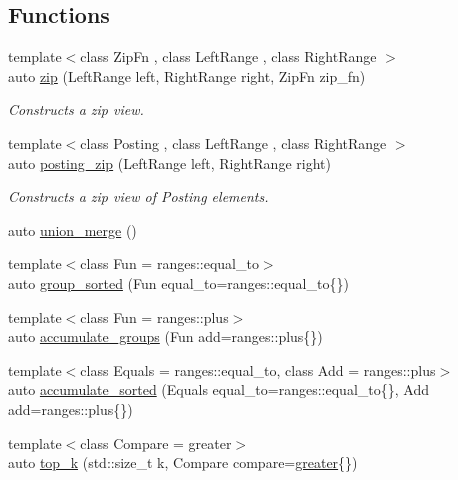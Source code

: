 \subsection*{Functions}
\begin{DoxyCompactItemize}
\item 
{\footnotesize template$<$class Zip\+Fn , class Left\+Range , class Right\+Range $>$ }\\auto \hyperlink{namespaceirkit_1_1view_ad4847c0d8f90f3c8854994d3289d51d6}{zip} (Left\+Range left, Right\+Range right, Zip\+Fn zip\+\_\+fn)
\begin{DoxyCompactList}\small\item\em Constructs a zip view. \end{DoxyCompactList}\item 
{\footnotesize template$<$class Posting , class Left\+Range , class Right\+Range $>$ }\\auto \hyperlink{namespaceirkit_1_1view_ab95e8c27c68f8d9864b2704de089abec}{posting\+\_\+zip} (Left\+Range left, Right\+Range right)
\begin{DoxyCompactList}\small\item\em Constructs a zip view of Posting elements. \end{DoxyCompactList}\item 
auto \hyperlink{namespaceirkit_1_1view_a45d94ed2030b7535ce266735e3dd49a3}{union\+\_\+merge} ()
\item 
{\footnotesize template$<$class Fun  = ranges\+::equal\+\_\+to$>$ }\\auto \hyperlink{namespaceirkit_1_1view_a7aa21c7e2a7953e6b669b2bad7f7102f}{group\+\_\+sorted} (Fun equal\+\_\+to=ranges\+::equal\+\_\+to\{\})
\item 
{\footnotesize template$<$class Fun  = ranges\+::plus$>$ }\\auto \hyperlink{namespaceirkit_1_1view_a2833f7d6ed97305f13072bd8de6faedf}{accumulate\+\_\+groups} (Fun add=ranges\+::plus\{\})
\item 
{\footnotesize template$<$class Equals  = ranges\+::equal\+\_\+to, class Add  = ranges\+::plus$>$ }\\auto \hyperlink{namespaceirkit_1_1view_a11c6ca66beb07c9749c099501322bda9}{accumulate\+\_\+sorted} (Equals equal\+\_\+to=ranges\+::equal\+\_\+to\{\}, Add add=ranges\+::plus\{\})
\item 
{\footnotesize template$<$class Compare  = greater$>$ }\\auto \hyperlink{namespaceirkit_1_1view_a0c54fd641ca22e5cb97fd55a3f5921a2}{top\+\_\+k} (std\+::size\+\_\+t k, Compare compare=\hyperlink{structirkit_1_1view_1_1greater}{greater}\{\})

\end{DoxyCompactItemize}
